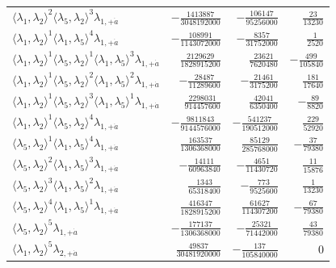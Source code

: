 \begin{longtable}{@{}lrrr@{}}
$\langle\lambda_1,\lambda_2\rangle^{2}\langle\lambda_5,\lambda_2\rangle^{3}\lambda_{1,+\dot a}$ & $-\frac{1413887}{3048192000}$ & $-\frac{106147}{95256000}$ & $\frac{23}{13230}$ \\
$\langle\lambda_1,\lambda_2\rangle^{1}\langle\lambda_1,\lambda_5\rangle^{4}\lambda_{1,+\dot a}$ & $-\frac{108991}{1143072000}$ & $-\frac{8357}{31752000}$ & $\frac{1}{2520}$ \\
$\langle\lambda_1,\lambda_2\rangle^{1}\langle\lambda_5,\lambda_2\rangle^{1}\langle\lambda_1,\lambda_5\rangle^{3}\lambda_{1,+\dot a}$ & $\frac{2129629}{1828915200}$ & $\frac{23621}{7620480}$ & $-\frac{499}{105840}$ \\
$\langle\lambda_1,\lambda_2\rangle^{1}\langle\lambda_5,\lambda_2\rangle^{2}\langle\lambda_1,\lambda_5\rangle^{2}\lambda_{1,+\dot a}$ & $-\frac{28487}{11289600}$ & $-\frac{21461}{3175200}$ & $\frac{181}{17640}$ \\
$\langle\lambda_1,\lambda_2\rangle^{1}\langle\lambda_5,\lambda_2\rangle^{3}\langle\lambda_1,\lambda_5\rangle^{1}\lambda_{1,+\dot a}$ & $\frac{2298031}{914457600}$ & $\frac{42041}{6350400}$ & $-\frac{89}{8820}$ \\
$\langle\lambda_1,\lambda_2\rangle^{1}\langle\lambda_5,\lambda_2\rangle^{4}\lambda_{1,+\dot a}$ & $-\frac{9811843}{9144576000}$ & $-\frac{541237}{190512000}$ & $\frac{229}{52920}$ \\
$\langle\lambda_5,\lambda_2\rangle^{1}\langle\lambda_1,\lambda_5\rangle^{4}\lambda_{1,+\dot a}$ & $\frac{163537}{1306368000}$ & $\frac{85129}{285768000}$ & $-\frac{37}{79380}$ \\
$\langle\lambda_5,\lambda_2\rangle^{2}\langle\lambda_1,\lambda_5\rangle^{3}\lambda_{1,+\dot a}$ & $-\frac{14111}{60963840}$ & $-\frac{4651}{11430720}$ & $\frac{11}{15876}$ \\
$\langle\lambda_5,\lambda_2\rangle^{3}\langle\lambda_1,\lambda_5\rangle^{2}\lambda_{1,+\dot a}$ & $\frac{1343}{65318400}$ & $-\frac{773}{9525600}$ & $\frac{1}{13230}$ \\
$\langle\lambda_5,\lambda_2\rangle^{4}\langle\lambda_1,\lambda_5\rangle^{1}\lambda_{1,+\dot a}$ & $\frac{416347}{1828915200}$ & $\frac{61627}{114307200}$ & $-\frac{67}{79380}$ \\
$\langle\lambda_5,\lambda_2\rangle^{5}\lambda_{1,+\dot a}$ & $-\frac{177137}{1306368000}$ & $-\frac{25321}{71442000}$ & $\frac{43}{79380}$ \\
$\langle\lambda_1,\lambda_2\rangle^{5}\lambda_{2,+\dot a}$ & $\frac{49837}{30481920000}$ & $-\frac{137}{105840000}$ & $0$ \\

\end{longtable}
